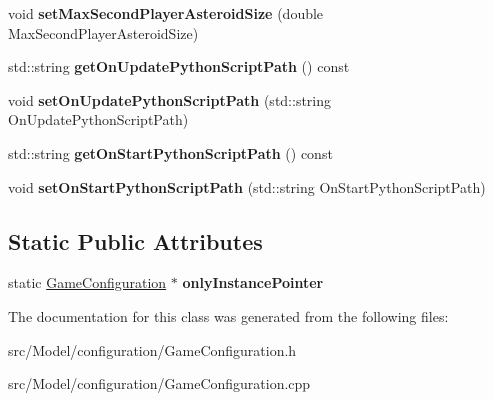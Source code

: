 \begin{DoxyCompactItemize}
\item 
void {\bfseries set\+Max\+Second\+Player\+Asteroid\+Size} (double Max\+Second\+Player\+Asteroid\+Size)\hypertarget{classGameConfiguration_ad6092534e7711dc2701d6e203aaba9b4}{}\label{classGameConfiguration_ad6092534e7711dc2701d6e203aaba9b4}

\item 
std\+::string {\bfseries get\+On\+Update\+Python\+Script\+Path} () const \hypertarget{classGameConfiguration_a27ba0a4a27c18b520672997b6d2a020f}{}\label{classGameConfiguration_a27ba0a4a27c18b520672997b6d2a020f}

\item 
void {\bfseries set\+On\+Update\+Python\+Script\+Path} (std\+::string On\+Update\+Python\+Script\+Path)\hypertarget{classGameConfiguration_a5e8d6f1b06ba4a4b95cd8f9ee75a00d9}{}\label{classGameConfiguration_a5e8d6f1b06ba4a4b95cd8f9ee75a00d9}

\item 
std\+::string {\bfseries get\+On\+Start\+Python\+Script\+Path} () const \hypertarget{classGameConfiguration_acd1eb75a6533b021b8b4b40e1ca91b6a}{}\label{classGameConfiguration_acd1eb75a6533b021b8b4b40e1ca91b6a}

\item 
void {\bfseries set\+On\+Start\+Python\+Script\+Path} (std\+::string On\+Start\+Python\+Script\+Path)\hypertarget{classGameConfiguration_a998f31704d2ec92f91a9e8b465e15410}{}\label{classGameConfiguration_a998f31704d2ec92f91a9e8b465e15410}

\end{DoxyCompactItemize}
\subsection*{Static Public Attributes}
\begin{DoxyCompactItemize}
\item 
static \hyperlink{classGameConfiguration}{Game\+Configuration} $\ast$ {\bfseries only\+Instance\+Pointer}\hypertarget{classGameConfiguration_a4abb60f0f416e1c5f5bcbf5a94b48789}{}\label{classGameConfiguration_a4abb60f0f416e1c5f5bcbf5a94b48789}

\end{DoxyCompactItemize}


The documentation for this class was generated from the following files\+:\begin{DoxyCompactItemize}
\item 
src/\+Model/configuration/Game\+Configuration.\+h\item 
src/\+Model/configuration/Game\+Configuration.\+cpp\end{DoxyCompactItemize}
